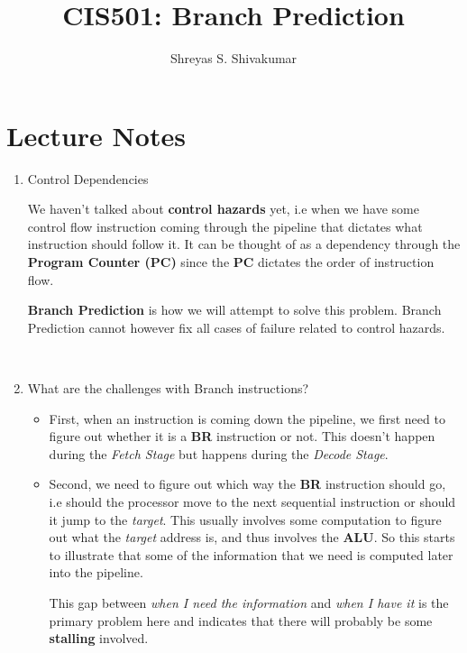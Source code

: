 \documentclass[12pt]{article}
\title{CIS501: Branch Prediction}
\author[1]{Shreyas S. Shivakumar}
\newenvironment{QandA}{\begin{enumerate}[label=\bfseries\arabic*.]\bfseries}
                      {\end{enumerate}}
\newenvironment{answered}{\par\quad\normalfont}{}
\begin{document}
\maketitle

\section{Lecture Notes}

\begin{QandA}
\item Control Dependencies
\begin{answered}
    We haven't talked about \textbf{control hazards} yet, i.e when we have some control flow instruction coming through the pipeline that dictates what instruction should follow it. It can be thought of as a dependency through the \textbf{Program Counter (PC)} since the \textbf{PC} dictates the order of instruction flow. 
    
    \qquad\textbf{Branch Prediction} is how we will attempt to solve this problem. Branch Prediction cannot however fix all cases of failure related to control hazards. 
\end{answered}

\ 

\item What are the challenges with Branch instructions?
\vspace{-0.85cm}
\begin{answered}
\begin{itemize}
    \item First, when an instruction is coming down the pipeline, we first need to figure out whether it is a \textbf{BR} instruction or not. This doesn't happen during the \textit{Fetch Stage} but happens during the \textit{Decode Stage}.
    
    \item Second, we need to figure out which way the \textbf{BR} instruction should go, i.e should the processor move to the next sequential instruction or should it jump to the \textit{target}. This usually involves some computation to figure out what the \textit{target} address is, and thus involves the \textbf{ALU}. So this starts to illustrate that some of the information that we need is computed later into the pipeline.
    
    This gap between \textit{when I need the information} and \textit{when I have it} is the primary problem here and indicates that there will probably be some \textbf{stalling} involved.
    

\end{itemize}
\end{answered}
\end{QandA}
\end{document}
